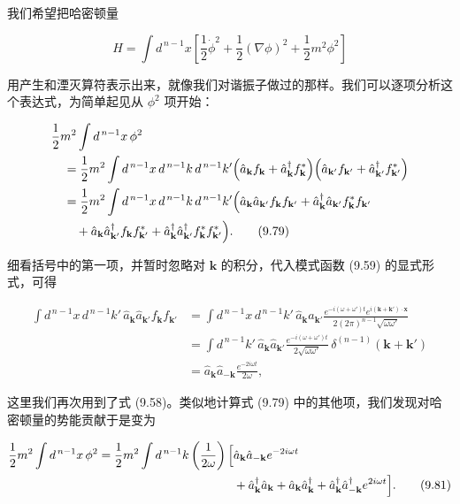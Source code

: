 我们希望把哈密顿量

\begin{equation*}
H = \int d^{\,n-1}x\left[\frac{1}{2}\dot{\phi}^2 + \frac{1}{2}(\nabla\phi)^2 + \frac{1}{2}m^2\phi^2\right]
\tag{9.78}
\end{equation*}

用产生和湮灭算符表示出来，就像我们对谐振子做过的那样。我们可以逐项分析这个表达式，为简单起见从 $\phi^2$ 项开始：

\begin{align*}
&\frac{1}{2}m^2\int d^{\,n-1}x\,\phi^2 \\
&\quad = \frac{1}{2}m^2\int d^{\,n-1}x\, d^{\,n-1}k\, d^{\,n-1}k'\Bigl(\hat{a}_{\mathbf{k}}f_{\mathbf{k}} + \hat{a}^{\dagger}_{\mathbf{k}}f^{*}_{\mathbf{k}}\Bigr)\Bigl(\hat{a}_{\mathbf{k}'}f_{\mathbf{k}'} + \hat{a}^{\dagger}_{\mathbf{k}'}f^{*}_{\mathbf{k}'}\Bigr) \\
&\quad = \frac{1}{2}m^2\int d^{\,n-1}x\, d^{\,n-1}k\, d^{\,n-1}k'\Bigl(\hat{a}_{\mathbf{k}}\hat{a}_{\mathbf{k}'}f_{\mathbf{k}}f_{\mathbf{k}'} + \hat{a}^{\dagger}_{\mathbf{k}}\hat{a}_{\mathbf{k}'}f^{*}_{\mathbf{k}}f_{\mathbf{k}'} \\
&\qquad + \hat{a}_{\mathbf{k}}\hat{a}^{\dagger}_{\mathbf{k}'}f_{\mathbf{k}}f^{*}_{\mathbf{k}'} + \hat{a}^{\dagger}_{\mathbf{k}}\hat{a}^{\dagger}_{\mathbf{k}'}f^{*}_{\mathbf{k}}f^{*}_{\mathbf{k}'}\Bigr).
\tag{9.79}
\end{align*}

细看括号中的第一项，并暂时忽略对 $\mathbf{k}$ 的积分，代入模式函数 (9.59) 的显式形式，可得

\begin{align*}
\int d^{\,n-1}x\, d^{\,n-1}k'\,\hat{a}_{\mathbf{k}}\hat{a}_{\mathbf{k}'}f_{\mathbf{k}}f_{\mathbf{k}'}
&= \int d^{\,n-1}x\, d^{\,n-1}k'\,\hat{a}_{\mathbf{k}}\hat{a}_{\mathbf{k}'}\frac{e^{-i(\omega+\omega')t}e^{i(\mathbf{k}+\mathbf{k}')\cdot\mathbf{x}}}{2(2\pi)^{n-1}\sqrt{\omega\omega'}} \\
&= \int d^{\,n-1}k'\,\hat{a}_{\mathbf{k}}\hat{a}_{\mathbf{k}'}\frac{e^{-i(\omega+\omega')t}}{2\sqrt{\omega\omega'}}\,\delta^{(n-1)}(\mathbf{k}+\mathbf{k}') \\
&= \hat{a}_{\mathbf{k}}\hat{a}_{-\mathbf{k}}\frac{e^{-2i\omega t}}{2\omega},
\tag{9.80}
\end{align*}

这里我们再次用到了式 (9.58)。类似地计算式 (9.79) 中的其他项，我们发现对哈密顿量的势能贡献于是变为

\begin{align*}
\frac{1}{2}m^2\int d^{\,n-1}x\,\phi^2 = \frac{1}{2}m^2\int d^{\,n-1}k\left(\frac{1}{2\omega}\right)\Bigl[&\hat{a}_{\mathbf{k}}\hat{a}_{-\mathbf{k}}e^{-2i\omega t} \\
&+ \hat{a}^{\dagger}_{\mathbf{k}}\hat{a}_{\mathbf{k}} + \hat{a}_{\mathbf{k}}\hat{a}^{\dagger}_{\mathbf{k}} + \hat{a}^{\dagger}_{\mathbf{k}}\hat{a}^{\dagger}_{-\mathbf{k}}e^{2i\omega t}\Bigr].
\tag{9.81}
\end{align*}

